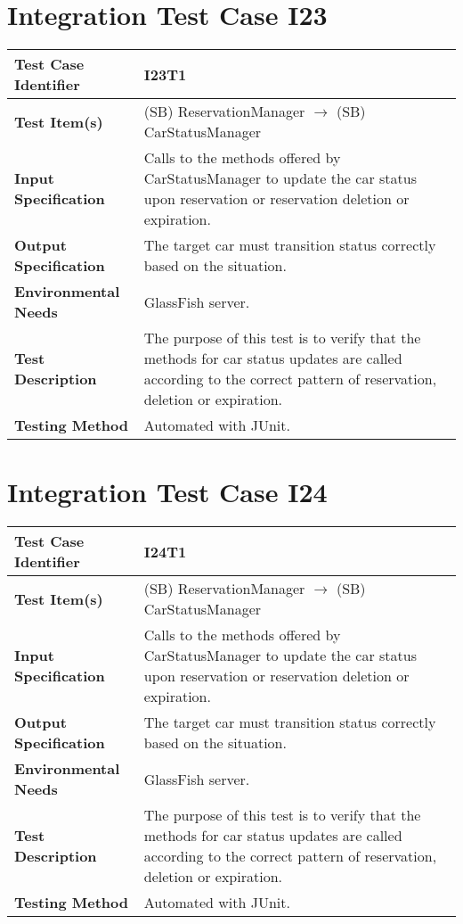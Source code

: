 \section{Integration Test Case I23}

\begin{longtable}{p{} | p{}}
\textbf{Test Case Identifier} & I23T1\\
\hline
\textbf{Test Item(s)} & (SB) ReservationManager $\rightarrow$ (SB) CarStatusManager \\
\hline
\textbf{Input Specification} & Calls to the methods offered by CarStatusManager to update the car status upon reservation or reservation deletion or expiration. \\
\hline
\textbf{Output Specification} & The target car must transition status correctly based on the situation. \\
\hline
\textbf{Environmental Needs} & GlassFish server. \\
\hline
\textbf{Test Description} & The purpose of this test is to verify that the methods for car status updates are called according to the correct pattern of reservation, deletion or expiration. \\
\hline
\textbf{Testing Method} & Automated with JUnit. \\
\hline
\end{longtable}

\section{Integration Test Case I24}

\begin{longtable}{p{} | p{}}
\textbf{Test Case Identifier} & I24T1\\
\hline
\textbf{Test Item(s)} & (SB) ReservationManager $\rightarrow$ (SB) CarStatusManager \\
\hline
\textbf{Input Specification} & Calls to the methods offered by CarStatusManager to update the car status upon reservation or reservation deletion or expiration. \\
\hline
\textbf{Output Specification} & The target car must transition status correctly based on the situation. \\
\hline
\textbf{Environmental Needs} & GlassFish server. \\
\hline
\textbf{Test Description} & The purpose of this test is to verify that the methods for car status updates are called according to the correct pattern of reservation, deletion or expiration. \\
\hline
\textbf{Testing Method} & Automated with JUnit. \\
\hline
\end{longtable}

